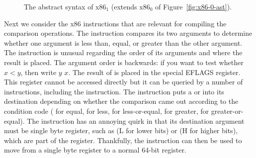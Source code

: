 \documentclass[11pt]{book}
\newcommand{\gray}[1]{{\color{gray} #1}}
\begin{document}
\begin{figure}[tp]
\fbox{
\begin{minipage}{0.96\textwidth}
\small    
\[
\begin{array}{lcl}
\itm{bytereg} &::=& \key{ah} \mid \key{al} \mid \key{bh} \mid \key{bl}
    \mid \key{ch} \mid \key{cl} \mid \key{dh} \mid \key{dl} \\
\Arg &::=&  \gray{\IMM{\Int} \mid \REG{\Reg} \mid \DEREF{\Reg}{\Int}} 
     \mid \BYTEREG{\itm{bytereg}} \\
\itm{cc} & ::= & \key{e} \mid \key{l} \mid \key{le} \mid \key{g} \mid \key{ge} \\
\Instr &::=& \gray{ \BININSTR{\code{'addq}}{\Arg}{\Arg} 
       \mid \BININSTR{\code{'subq}}{\Arg}{\Arg} } \\
       &\mid& \gray{ \BININSTR{\code{'movq}}{\Arg}{\Arg} 
       \mid \UNIINSTR{\code{'negq}}{\Arg} } \\
       &\mid& \gray{ \CALLQ{\itm{label}}{\itm{int}} \mid \RETQ{} 
       \mid \PUSHQ{\Arg} \mid \POPQ{\Arg} \mid \JMP{\itm{label}} } \\
       &\mid& \BININSTR{\code{'xorq}}{\Arg}{\Arg}
       \mid \BININSTR{\code{'cmpq}}{\Arg}{\Arg}\\
       &\mid& \BININSTR{\code{'set}}{\itm{cc}}{\Arg} 
       \mid \BININSTR{\code{'movzbq}}{\Arg}{\Arg}\\
       &\mid&  \JMPIF{\itm{cc}}{\itm{label}} \\
\Block &::= & \gray{\BLOCK{\itm{info}}{\Instr\ldots}} \\
x86_1 &::= & \gray{\PROGRAM{\itm{info}}{\CFG{\key{(}\itm{label} \,\key{.}\, \Block \key{)}\ldots}}}
\end{array}
\]
\end{minipage}
}
\caption{The abstract syntax of x86$_1$ (extends x86$_0$ of Figure~\ref{fig:x86-0-ast}).}
\label{fig:x86-1}
\end{figure}

Next we consider the x86 instructions that are relevant for compiling
the comparison operations. The  instruction compares its two
arguments to determine whether one argument is less than, equal, or
greater than the other argument. The  instruction is unusual
regarding the order of its arguments and where the result is
placed. The argument order is backwards: if you want to test whether
$x < y$, then write  $y$\code{,} $x$. The result of
 is placed in the special EFLAGS register. This register
cannot be accessed directly but it can be queried by a number of
instructions, including the  instruction. The 
instruction puts a  or  into its destination depending
on whether the comparison came out according to the condition code
 ( for equal,  for less,  for
less-or-equal,  for greater,  for greater-or-equal).
The  instruction has an annoying quirk in that its
destination argument must be single byte register, such as 
(L for lower bits) or  (H for higher bits), which are part of
the  register.  Thankfully, the  instruction can
then be used to move from a single byte register to a normal 64-bit
register.
\end{document}
